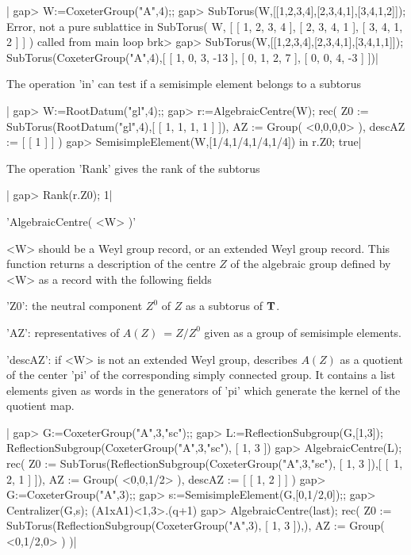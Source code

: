 |    gap> W:=CoxeterGroup("A",4);;
    gap> SubTorus(W,[[1,2,3,4],[2,3,4,1],[3,4,1,2]]);
    Error, not a pure sublattice in
    SubTorus( W, [ [ 1, 2, 3, 4 ], [ 2, 3, 4, 1 ], [ 3, 4, 1, 2 ] ]
     ) called from
    main loop
    brk>
    gap> SubTorus(W,[[1,2,3,4],[2,3,4,1],[3,4,1,1]]);
    SubTorus(CoxeterGroup("A",4),[ [ 1, 0, 3, -13 ], [ 0, 1, 2, 7 ], [ 0,
    0, 4, -3 ] ])|


The operation 'in' can test if a semisimple element belongs to a subtorus\:

|    gap> W:=RootDatum("gl",4);;
    gap> r:=AlgebraicCentre(W);
    rec(
      Z0 := SubTorus(RootDatum("gl",4),[ [ 1, 1, 1, 1 ] ]),
      AZ := Group( <0,0,0,0> ),
      descAZ := [ [ 1 ] ] )
    gap> SemisimpleElement(W,[1/4,1/4,1/4,1/4]) in r.Z0;
    true|

The operation 'Rank' gives the rank of the subtorus\:

|    gap> Rank(r.Z0);
    1|


'AlgebraicCentre( <W> )'

<W>  should be a Weyl group record,  or an extended Weyl group record. This
function  returns a  description of  the centre  $Z$ of the algebraic group
defined by <W> as a record with the following fields\:

'Z0':  the neutral component $Z^0$  of $Z$ as a subtorus of ${\mathbf T}$.

'AZ':  representatives  of  $A(Z)\:=Z/Z^0$  given  as a group of semisimple
elements.

'descAZ':  if <W>  is not  an extended  Weyl group,  describes $A(Z)$  as a
   quotient of the center 'pi' of the corresponding simply connected group.
   It  contains a list  elements given as  words in the  generators of 'pi'
   which generate the kernel of the quotient map.

|    gap> G:=CoxeterGroup("A",3,"sc");;
    gap> L:=ReflectionSubgroup(G,[1,3]);
    ReflectionSubgroup(CoxeterGroup("A",3,"sc"), [ 1, 3 ])
    gap> AlgebraicCentre(L);
    rec(
      Z0 :=
       SubTorus(ReflectionSubgroup(CoxeterGroup("A",3,"sc"), [ 1, 3 ]),[ [\
     1, 2, 1 ] ]),
      AZ := Group( <0,0,1/2> ),
      descAZ := [ [ 1, 2 ] ] )
    gap> G:=CoxeterGroup("A",3);;
    gap> s:=SemisimpleElement(G,[0,1/2,0]);;
    gap> Centralizer(G,s);
    (A1xA1)<1,3>.(q+1)
    gap> AlgebraicCentre(last);
    rec(
      Z0 := SubTorus(ReflectionSubgroup(CoxeterGroup("A",3), [ 1, 3 ]),),
      AZ := Group( <0,1/2,0> ) )|

